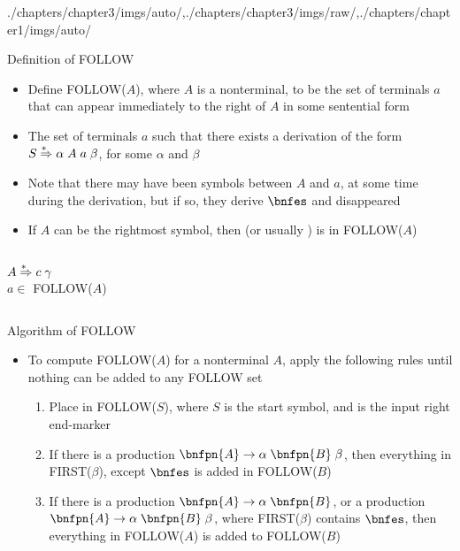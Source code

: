 \begin{graphicspathcontext}{{./chapters/chapter3/imgs/auto/},{./chapters/chapter3/imgs/raw/},{./chapters/chapter1/imgs/auto/}}
\begin{bibunit}[apalike]
\begin{frame}{Definition of FOLLOW}
	\begin{scriptsize}
	\begin{itemize}
	\item Define FOLLOW($A$), where $A$ is a nonterminal, to be the set of terminals $a$ that can appear immediately to the right of $A$ in some sentential form
	\item The set of terminals $a$ such that there exists a derivation of the form $S \overset{*\hspace{.4em}}{\Rightarrow} \alpha\;A\;a\;\beta$, for some $\alpha$ and $\beta$
	\item Note that there may have been symbols between $A$ and $a$, at some time during the derivation, but if so, they derive $\bnfes$ and disappeared
	\item If $A$ can be the rightmost symbol, then  (or usually \bnfts{\$}) is in FOLLOW($A$)
	\end{itemize}
	\end{scriptsize}
	\vfill
	\begin{small}
	\begin{example}
		\begin{columns}
			\begin{column}[t]{.4\linewidth}
				$A \overset{*\hspace{.4em}}{\Rightarrow} c\;\gamma$ \\
				$a \in $ FOLLOW($A$)
			\end{column}
			\begin{column}[t]{.4\linewidth}
			\end{column}
		\end{columns}
	\end{example}
	\end{small}
\end{frame}

\begin{frame}[background=8]{Algorithm of FOLLOW}
	\begin{itemize}
	\item To compute FOLLOW($A$) for a nonterminal $A$, apply the following rules until nothing can be added to any FOLLOW set
		\begin{enumerate}
		\vfill
		\item Place  in FOLLOW($S$), where $S$ is the start symbol, and  is the input right end-marker
		\vfill
		\item If there is a production $\bnfpn{A} \bnfopo \alpha\;\bnfpn{B}\;\beta$, then everything in FIRST($\beta$), except $\bnfes$ is added in FOLLOW($B$)
		\vfill
		\item If there is a production $\bnfpn{A} \bnfopo \alpha\;\bnfpn{B}$, or a production $\bnfpn{A} \bnfopo \alpha\;\bnfpn{B}\;\beta$, where FIRST($\beta$) contains $\bnfes$, then everything in FOLLOW($A$) is added to FOLLOW($B$)
		\end{enumerate}
	\end{itemize}
\end{frame}


\end{bibunit}
\end{graphicspathcontext}
